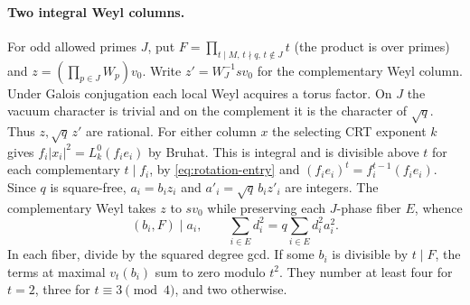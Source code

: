 \documentclass[11pt]{amsart}
\numberwithin{equation}{section}
\theoremstyle{definition}
\theoremstyle{plain}
\begin{document}
\paragraph{Two integral Weyl columns.}
For odd allowed primes $J$, put $F=\prod_{t\mid M,\,t\nmid q,\,t\notin J}t$
(the product is over primes) and $z=(\prod_{p\in J}W_p)v_0$.
Write $z'=W_J^{-1}sv_0$ for the complementary Weyl column.
Under Galois conjugation each local Weyl acquires a torus factor.
On $J$ the vacuum character is trivial and on the complement it
is the character of $\sqrt q$. Thus $z,\sqrt q\,z'$ are rational.
For either column $x$ the selecting CRT exponent $k$ gives
$f_i|x_i|^2=L_k^0(f_ie_i)$ by Bruhat. This is integral and is
divisible above $t$ for each complementary $t\mid f_i$, by
\eqref{eq:rotation-entry} and $(f_ie_i)^t=f_i^{t-1}(f_ie_i)$.
Since $q$ is square-free, $a_i=b_i z_i$ and $a'_i=\sqrt q\,b_i z'_i$
are integers. The complementary Weyl takes $z$ to $sv_0$ while
preserving each $J$-phase fiber $E$, whence
\begin{equation}\label{eq:phase-column}
 (b_i,F)\mid a_i,\qquad
 \sum_{i\in E}d_i^2=q\sum_{i\in E}d_i^2a_i^2 .
\end{equation}
In each fiber, divide by the squared degree gcd. If some $b_i$ is
divisible by $t\mid F$, the terms at maximal $v_t(b_i)$ sum to
zero modulo $t^2$. They number at least four for $t=2$, three
for $t\equiv3\pmod4$, and two otherwise.
\end{document}
